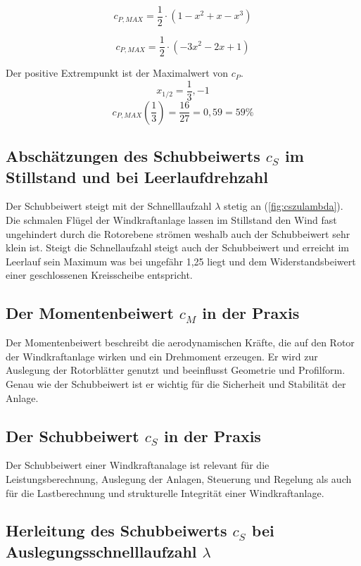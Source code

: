 \begin{equation}
c_{P,MAX}= \frac{1}{2} \cdot (1-x^2+x-x^3)
\label{eq:CPMAX}
\end{equation}

\begin{equation}
c_{P,MAX}=\frac{1}{2} \cdot (-3x^2-2x+1)
\label{eq:CPMAX2}
\end{equation}
 
Der positive Extrempunkt ist der Maximalwert von $c_P$.  $$x_{1/2}= \frac{1}{3}, -1$$
$$c_{P,MAX}(\frac{1}{3})= \frac{16}{27} = 0,59 = 59\%$$

\subsection{Abschätzungen des Schubbeiwerts \texorpdfstring{$c_S$}{} im Stillstand und bei
Leerlaufdrehzahl}

Der Schubbeiwert steigt mit der Schnelllaufzahl $\lambda$ stetig an (\ref{fig:cszulambda}). Die schmalen Flügel der Windkraftanlage lassen im Stillstand den Wind fast ungehindert durch die Rotorebene strömen weshalb auch der Schubbeiwert sehr klein ist. Steigt die Schnellaufzahl steigt auch der Schubbeiwert und erreicht im Leerlauf sein Maximum was bei ungefähr 1,25 liegt und dem Widerstandsbeiwert einer geschlossenen Kreisscheibe entspricht. 


\subsection{Der Momentenbeiwert \texorpdfstring{$c_M$}{} in der Praxis}

Der Momentenbeiwert beschreibt die aerodynamischen Kräfte, die auf den Rotor der Windkraftanlage wirken und ein Drehmoment erzeugen. Er wird zur Auslegung der Rotorblätter genutzt und beeinflusst Geometrie und Profilform. Genau wie der Schubbeiwert ist er wichtig für die Sicherheit und Stabilität der Anlage. 


\subsection{Der Schubbeiwert \texorpdfstring{$c_S$}{} in der Praxis}

Der Schubbeiwert einer Windkraftanalage ist relevant für die Leistungsberechnung, Auslegung der Anlagen, Steuerung und Regelung als auch für die Lastberechnung und strukturelle Integrität einer Windkraftanlage. 

\subsection{Herleitung des Schubbeiwerts \texorpdfstring{$c_S$}{} bei Auslegungsschnelllaufzahl \texorpdfstring{$\lambda$}{}}

